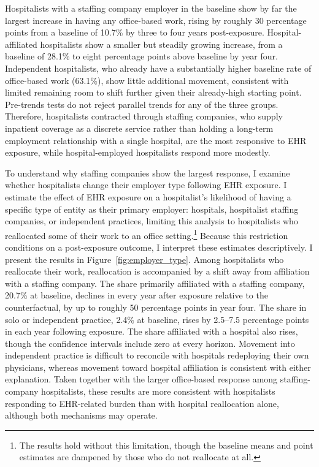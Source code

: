 \documentclass[12pt]{article}
\begin{document}
Hospitalists with a staffing company employer in the baseline show by far the largest increase in having any office-based work, rising by roughly 30 percentage points from a baseline of 10.7\% by three to four years post-exposure. Hospital-affiliated hospitalists show a smaller but steadily growing increase, from a baseline of 28.1\% to eight percentage points above baseline by year four. Independent hospitalists, who already have a substantially higher baseline rate of office-based work (63.1\%), show little additional movement, consistent with limited remaining room to shift further given their already-high starting point. Pre-trends tests do not reject parallel trends for any of the three groups. Therefore, hospitalists contracted through staffing companies, who supply inpatient coverage as a discrete service rather than holding a long-term employment relationship with a single hospital, are the most responsive to EHR exposure, while hospital-employed hospitalists respond more modestly.

To understand why staffing companies show the largest response, I examine whether hospitalists change their employer type following EHR exposure. I estimate the effect of EHR exposure on a hospitalist's likelihood of having a specific type of entity as their primary employer: hospitals, hospitalist staffing companies, or independent practices, limiting this analysis to hospitalists who reallocated some of their work to an office setting.\footnote{The results hold without this limitation, though the baseline means and point estimates are dampened by those who do not reallocate at all.} Because this restriction conditions on a post-exposure outcome, I interpret these estimates descriptively. I present the results in Figure~\ref{fig:employer_type}. Among hospitalists who reallocate their work, reallocation is accompanied by a shift away from affiliation with a staffing company. The share primarily affiliated with a staffing company, 20.7\% at baseline, declines in every year after exposure relative to the counterfactual, by up to roughly 50 percentage points in year four. The share in solo or independent practice, 2.4\% at baseline, rises by 2.5--7.5 percentage points in each year following exposure. The share affiliated with a hospital also rises, though the confidence intervals include zero at every horizon. Movement into independent practice is difficult to reconcile with hospitals redeploying their own physicians, whereas movement toward hospital affiliation is consistent with either explanation. Taken together with the larger office-based response among staffing-company hospitalists, these results are more consistent with hospitalists responding to EHR-related burden than with hospital reallocation alone, although both mechanisms may operate.
\end{document}
